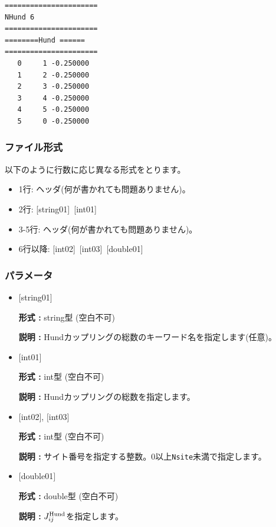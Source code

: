 \begin{minipage}{12.5cm}
\begin{screen}
\begin{verbatim}
====================== 
NHund 6  
====================== 
========Hund ====== 
====================== 
   0     1 -0.250000
   1     2 -0.250000
   2     3 -0.250000
   3     4 -0.250000
   4     5 -0.250000
   5     0 -0.250000
\end{verbatim}
\end{screen}
\end{minipage}

\subsubsection{ファイル形式}
以下のように行数に応じ異なる形式をとります。
 \begin{itemize}
   \item  1行:  ヘッダ(何が書かれても問題ありません)。
   \item  2行:   [string01]~[int01]
   \item  3-5行:  ヘッダ(何が書かれても問題ありません)。
   \item  6行以降:
   [int02]~[int03]~[double01] 
  \end{itemize}
\subsubsection{パラメータ}
 \begin{itemize}

   \item  $[$string01$]$
   
    {\bf 形式 :} string型 (空白不可)

   {\bf 説明 :} Hundカップリングの総数のキーワード名を指定します(任意)。

   \item  $[$int01$]$
   
    {\bf 形式 :} int型 (空白不可)

   {\bf 説明 :} Hundカップリングの総数を指定します。

  \item  $[$int02$]$, $[$int03$]$
  
 {\bf 形式 :} int型 (空白不可)

{\bf 説明 :} サイト番号を指定する整数。0以上\verb|Nsite|{未満}で指定します。
 
 \item  $[$double01$]$
   
   {\bf 形式 :} double型 (空白不可)

  {\bf 説明 :}  $J_{ij}^{\rm Hund}$を指定します。
  
\end{itemize}

